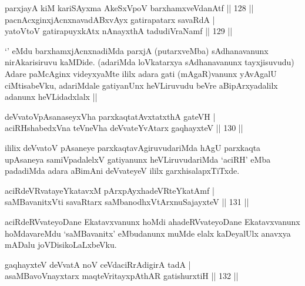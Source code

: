 
\begin{shl}
parxjayA kiM kariSAyxma AkeSxVpoV barxhamxveVdanAtf \hfill|| 128 || \\
pacnAcxginxjAcnxnavadABxvAyx gatirapatarx savaRdA | \\
yatoV\s toV gatirapuyxkAtx nAnayxthA tadudiVraNamf \hfill|| 129 || 
\end{shl}

\begin{artha}
`\stext' eMdu barxhamxjAcnxnadiMda parxjA (putarxveMba) sAdhanavanunx
  nirAkarisiruvu kaMDide. (adariMda loVkatarxya sAdhanavanunx
  tayxjisuvudu) Adare paMcAginx videyxyaMte ililx adara gati
  (mAgaR)vanunx yAvAgalU ciMtisabeVku, adariMdale gatiyanUnx
  heVLiruvudu beVre aBipArxyadalilx adanunx heVLidadxlalx ||
\end{artha}


\begin{shl}
deVvatoVpAsanaseyxVha parxkaqtatAvxtatxthA gateVH | \\
aciRHshabedxVna teVneVha deVvateYvAtarx gaqhayxteV \hfill|| 130 || 
\end{shl}

\begin{artha}
ililix deVvatoV pAsaneye parxkaqtavAgiruvudariMda hAgU parxkaqta
upAsaneya samiVpadalelxV gatiyanunx heVLiruvudariMda `aciRH' eMba
padadiMda adara aBimAni deVvateyeV ililx garxhisalapxTiTxde. 
\end{artha}

\begin{shl}
aciRdeVRvatayeYkatavxM pArxpAyxhadeVRteYkatAmf | \\
saMBavanitxVti savaRtarx saMbanodhxV\s tArxnuSajayxteV \hfill|| 131 || 
\end{shl}

\begin{artha}
aciRdeRVvateyoDane Ekatavxvanunx hoMdi ahadeRVvateyoDane Ekatavxvanunx
hoMdavareMdu `saMBavanitx' eMbudanunx muMde elalx kaDeyalUlx anavxya
mADalu joVDisikoLaLxbeVku.
\end{artha}


\begin{shl}
gaqhayxteV deVvatA noV ceVdaciRrAdigirA tadA | \\
asaMBavoV\s nayxtarx maqteVritayxpAthAR gatishurxtiH \hfill|| 132 || 
\end{shl}

